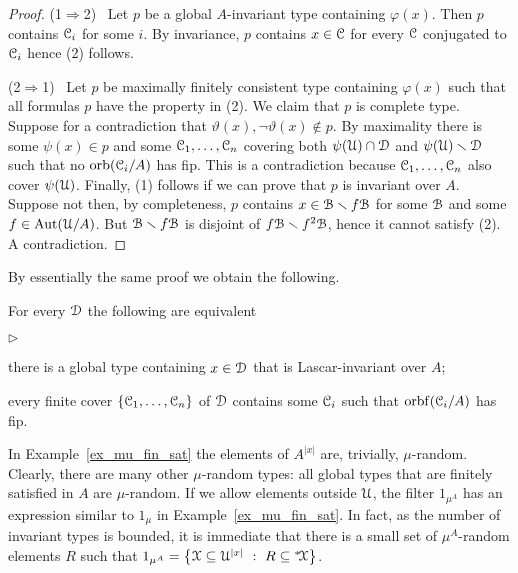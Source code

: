 \documentclass{amsproc}
\newcommand{\mylabel}[1]{{#1}\hfill}
\renewenvironment{itemize}
  {\begin{list}{$\triangleright$}{%
  \setlength{\parskip}{0mm}
  \setlength{\topsep}{.4\baselineskip}
  \setlength{\rightmargin}{0mm}
  \setlength{\listparindent}{0mm}
  \setlength{\itemindent}{0mm}
  \setlength{\labelwidth}{3ex}
  \setlength{\itemsep}{.2\baselineskip}
  \setlength{\parsep}{.2\baselineskip}
  \setlength{\partopsep}{0mm}
  \setlength{\labelsep}{1ex}
  \setlength{\leftmargin}{\labelwidth+\labelsep}
  \let\makelabel\mylabel}}{%
\end{list}}
\begin{document}
\begin{proof}
  (1$\Rightarrow$2) \ Let $p$ be a global $A$-invariant type containing $\varphi(x)$.
  Then $p$ contains $\EuScript C_i$ for some $i$.
  By invariance, $p$ contains $x\in\EuScript C$ for every $\EuScript C$ conjugated to $\EuScript C_i$ hence (2) follows.

  (2$\Rightarrow$1) \ Let $p$ be maximally finitely consistent type containing $\varphi(x)$ such that all formulas $p$ have the property in (2).
  We claim that $p$ is complete type.
  Suppose for a contradiction that $\vartheta(x),\neg\vartheta(x)\notin p$.
  By maximality there is some $\psi(x)\in p$ and some $\EuScript C_1,\dots,\EuScript C_n$ covering both $\psi(\EuScript U)\cap\EuScript D$ and $\psi(\EuScript U)\smallsetminus\EuScript D$ such that no ${\rm orb}(\EuScript C_i/A)$ has fip.
  This is a contradiction because $\EuScript C_1,\dots,\EuScript C_n$ also cover $\psi(\EuScript U)$.
  Finally, (1) follows if we can prove that $p$ is invariant over $A$.
  Suppose not then, by completeness, $p$ contains $x\in\EuScript B\smallsetminus f\EuScript B$ for some $\EuScript B$ and some $f\in{\rm Aut}(\EuScript U/A)$.
  But $\EuScript B\smallsetminus f\EuScript B$ is disjoint of $f\EuScript B\smallsetminus f^2\EuScript B$, hence it cannot satisfy (2).
  A contradiction.
\end{proof}

By essentially the same proof we obtain the following.

\begin{fact}\label{fact_Lig}
  For every $\EuScript D$ the following are equivalent
  \begin{itemize}
    \item [1.] there is a global type containing $x\in\EuScript D$ that is Lascar-invariant over $A$;
    \item [2.] every finite cover  $\{\EuScript C_1,\dots,\EuScript C_n\}$ of $\EuScript D$ contains some $\EuScript C_i$ such that ${\rm orbf}(\EuScript C_i/A)$ has fip.
  \end{itemize}
\end{fact}

In Example~\ref{ex_mu_fin_sat} the elements of $A^{|x|}$ are, trivially, $\mu$-random.
Clearly, there are many other $\mu$-random types: all global types that are finitely satisfied in $A$ are $\mu$-random.
If we allow elements outside $\EuScript U$, the filter $1_{\mu^A}$ has an expression similar to $1_\mu$ in Example~\ref{ex_mu_fin_sat}.
In fact, as the number of invariant types is bounded, it is immediate that there is a small set of $\mu^A$-random elements $R$ such that $1_{\mu^A}=\big\{\EuScript X\subseteq\EuScript U^{|x|}\ :\ R\subseteq{}^*\!\EuScript X\big\}$.
\end{document}
